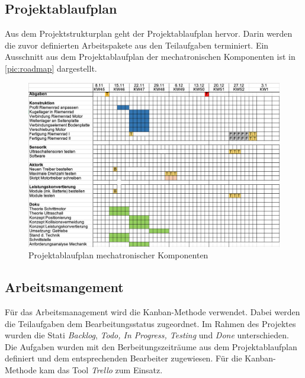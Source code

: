 \newpage
\subsection{Projektablaufplan}
\label{sec:projektablaufplan}
Aus dem Projektstrukturplan geht der Projektablaufplan hervor. Darin werden die zuvor definierten Arbeitspakete aus den Teilaufgaben terminiert. Ein Ausschnitt aus dem Projektablaufplan der mechatronischen Komponenten ist in \autoref{pic:roadmap} dargestellt. 
\begin{figure}[h]
	\begin{center}
		\includegraphics[width=17cm]{roadmap.png}
		\caption{Projektablaufplan mechatronischer Komponenten}
		\label{pic:roadmap}
	\end{center}
\end{figure}



\newpage
\subsection{Arbeitsmangement}
\label{sec:arbeitsmanagement}
Für das Arbeitsmanagement wird die Kanban-Methode verwendet. Dabei werden die Teilaufgaben dem Bearbeitungsstatus zugeordnet. Im Rahmen des Projektes wurden die Stati \textit{Backlog}, \textit{Todo,  In Progress, Testing} und \textit{Done}  unterschieden. 
Die Aufgaben wurden mit den Berbeitungszeiträume aus dem Projektablaufplan definiert und dem entsprechenden Bearbeiter zugewiesen. 	
Für die Kanban-Methode kam das Tool \textit{Trello} zum Einsatz. 



